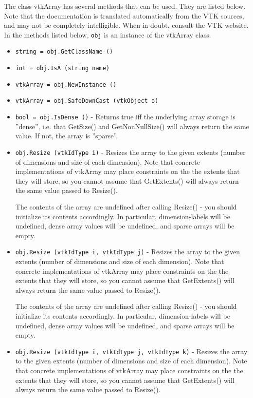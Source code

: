 The class vtkArray has several methods that can be used.
  They are listed below.
Note that the documentation is translated automatically from the VTK sources,
and may not be completely intelligible.  When in doubt, consult the VTK website.
In the methods listed below, \verb|obj| is an instance of the vtkArray class.
\begin{itemize}
\item  \verb|string = obj.GetClassName ()|

\item  \verb|int = obj.IsA (string name)|

\item  \verb|vtkArray = obj.NewInstance ()|

\item  \verb|vtkArray = obj.SafeDownCast (vtkObject o)|

\item  \verb|bool = obj.IsDense ()| -  Returns true iff the underlying array storage is ''dense'', i.e. that GetSize() and
 GetNonNullSize() will always return the same value.  If not, the array is ''sparse''.

\item  \verb|obj.Resize (vtkIdType i)| -  Resizes the array to the given extents (number of dimensions and size of each dimension).
 Note that concrete implementations of vtkArray may place constraints on the the extents
 that they will store, so you cannot assume that GetExtents() will always return the same
 value passed to Resize().

 The contents of the array are undefined after calling Resize() - you should
 initialize its contents accordingly.  In particular, dimension-labels will be
 undefined, dense array values will be undefined, and sparse arrays will be
 empty.

\item  \verb|obj.Resize (vtkIdType i, vtkIdType j)| -  Resizes the array to the given extents (number of dimensions and size of each dimension).
 Note that concrete implementations of vtkArray may place constraints on the the extents
 that they will store, so you cannot assume that GetExtents() will always return the same
 value passed to Resize().

 The contents of the array are undefined after calling Resize() - you should
 initialize its contents accordingly.  In particular, dimension-labels will be
 undefined, dense array values will be undefined, and sparse arrays will be
 empty.

\item  \verb|obj.Resize (vtkIdType i, vtkIdType j, vtkIdType k)| -  Resizes the array to the given extents (number of dimensions and size of each dimension).
 Note that concrete implementations of vtkArray may place constraints on the the extents
 that they will store, so you cannot assume that GetExtents() will always return the same
 value passed to Resize().


\end{itemize}
